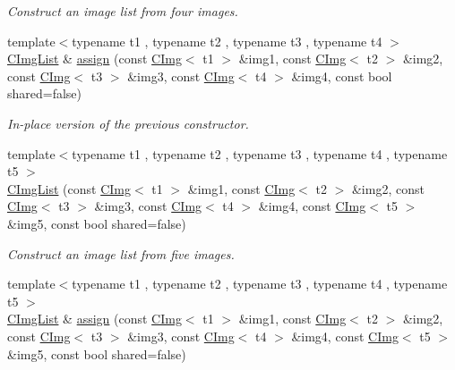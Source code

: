\begin{DoxyCompactItemize}
\begin{DoxyCompactList}\small\item\em Construct an image list from four images. \end{DoxyCompactList}\item 
\hypertarget{structcimg__library_1_1_c_img_list_aa7ceaa2baa92b3e3b275e6e60b659d4c}{{\footnotesize template$<$typename t1 , typename t2 , typename t3 , typename t4 $>$ }\\\hyperlink{structcimg__library_1_1_c_img_list}{C\-Img\-List} \& \hyperlink{structcimg__library_1_1_c_img_list_aa7ceaa2baa92b3e3b275e6e60b659d4c}{assign} (const \hyperlink{structcimg__library_1_1_c_img}{C\-Img}$<$ t1 $>$ \&img1, const \hyperlink{structcimg__library_1_1_c_img}{C\-Img}$<$ t2 $>$ \&img2, const \hyperlink{structcimg__library_1_1_c_img}{C\-Img}$<$ t3 $>$ \&img3, const \hyperlink{structcimg__library_1_1_c_img}{C\-Img}$<$ t4 $>$ \&img4, const bool shared=false)}\label{structcimg__library_1_1_c_img_list_aa7ceaa2baa92b3e3b275e6e60b659d4c}

\begin{DoxyCompactList}\small\item\em In-\/place version of the previous constructor. \end{DoxyCompactList}\item 
\hypertarget{structcimg__library_1_1_c_img_list_abf7a0a9e7f7575a50e07b63e6c267a1d}{{\footnotesize template$<$typename t1 , typename t2 , typename t3 , typename t4 , typename t5 $>$ }\\\hyperlink{structcimg__library_1_1_c_img_list_abf7a0a9e7f7575a50e07b63e6c267a1d}{C\-Img\-List} (const \hyperlink{structcimg__library_1_1_c_img}{C\-Img}$<$ t1 $>$ \&img1, const \hyperlink{structcimg__library_1_1_c_img}{C\-Img}$<$ t2 $>$ \&img2, const \hyperlink{structcimg__library_1_1_c_img}{C\-Img}$<$ t3 $>$ \&img3, const \hyperlink{structcimg__library_1_1_c_img}{C\-Img}$<$ t4 $>$ \&img4, const \hyperlink{structcimg__library_1_1_c_img}{C\-Img}$<$ t5 $>$ \&img5, const bool shared=false)}\label{structcimg__library_1_1_c_img_list_abf7a0a9e7f7575a50e07b63e6c267a1d}

\begin{DoxyCompactList}\small\item\em Construct an image list from five images. \end{DoxyCompactList}\item 
\hypertarget{structcimg__library_1_1_c_img_list_a3129c3b96cdcd5ac9eb2390984ea811e}{{\footnotesize template$<$typename t1 , typename t2 , typename t3 , typename t4 , typename t5 $>$ }\\\hyperlink{structcimg__library_1_1_c_img_list}{C\-Img\-List} \& \hyperlink{structcimg__library_1_1_c_img_list_a3129c3b96cdcd5ac9eb2390984ea811e}{assign} (const \hyperlink{structcimg__library_1_1_c_img}{C\-Img}$<$ t1 $>$ \&img1, const \hyperlink{structcimg__library_1_1_c_img}{C\-Img}$<$ t2 $>$ \&img2, const \hyperlink{structcimg__library_1_1_c_img}{C\-Img}$<$ t3 $>$ \&img3, const \hyperlink{structcimg__library_1_1_c_img}{C\-Img}$<$ t4 $>$ \&img4, const \hyperlink{structcimg__library_1_1_c_img}{C\-Img}$<$ t5 $>$ \&img5, const bool shared=false)}\label{structcimg__library_1_1_c_img_list_a3129c3b96cdcd5ac9eb2390984ea811e}


\end{DoxyCompactItemize}
